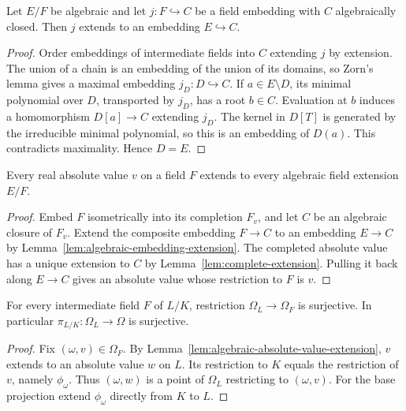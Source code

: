 \begin{lemma}\label{lem:algebraic-embedding-extension}
\mathlibok
{}
Let $E/F$ be algebraic and let $j:F\hookrightarrow C$ be a field embedding
with $C$ algebraically closed. Then $j$ extends to an embedding $E\hookrightarrow C$.
\end{lemma}
\begin{proof}
Order embeddings of intermediate fields into $C$ extending $j$ by
extension. The union of a chain is an embedding of the union of its domains,
so Zorn's lemma gives a maximal embedding $j_D:D\hookrightarrow C$.
If $a\in E\setminus D$, its minimal polynomial over $D$, transported by
$j_D$, has a root $b\in C$. Evaluation at $b$ induces a homomorphism
$D[a]\to C$ extending $j_D$. The kernel in $D[T]$ is generated by the
irreducible minimal polynomial, so this is an embedding of $D(a)$.
This contradicts maximality. Hence $D=E$.
\end{proof}

\begin{lemma}
\label{lem:algebraic-absolute-value-extension}
\leanok
{}
Every real absolute value $v$ on a field $F$ extends to every algebraic
field extension $E/F$.
\end{lemma}
\begin{proof}
Embed $F$ isometrically into its completion $F_v$, and let $C$ be an
algebraic closure of $F_v$. Extend the composite embedding $F\to C$
to an embedding $E\to C$ by Lemma~\ref{lem:algebraic-embedding-extension}.
The completed absolute value has a unique extension to $C$ by
Lemma~\ref{lem:complete-extension}. Pulling it back along $E\to C$
gives an absolute value whose restriction to $F$ is $v$.
\end{proof}

\begin{proposition}\label{prop:algebraic-restriction-surjective}
\leanok
{}
For every intermediate field $F$ of $L/K$, restriction $\Omega_L\to\Omega_F$
is surjective. In particular $\pi_{L/K}:\Omega_L\to\Omega$ is surjective.
\end{proposition}
\begin{proof}
Fix $(\omega,v)\in\Omega_F$. By
Lemma~\ref{lem:algebraic-absolute-value-extension}, $v$ extends to an
absolute value $w$ on $L$. Its restriction to $K$ equals the restriction
of $v$, namely $\phi_\omega$. Thus $(\omega,w)$ is a point of
$\Omega_L$ restricting to $(\omega,v)$. For the base projection extend
$\phi_\omega$ directly from $K$ to $L$.
\end{proof}


